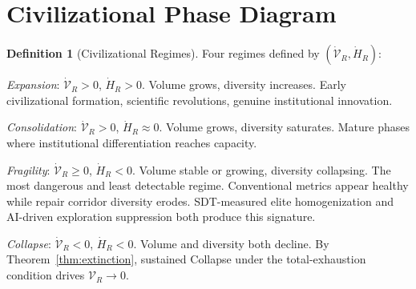 \documentclass[12pt, a4paper]{article}
\theoremstyle{plain}
\theoremstyle{definition}
\newtheorem{definition}{Definition}
\theoremstyle{remark}
\begin{document}
\section{Civilizational Phase Diagram}

\begin{definition}[Civilizational Regimes]
Four regimes defined by $(\dot{\mathcal{V}}_R, \dot{H}_R)$:

\textit{Expansion}: $\dot{\mathcal{V}}_R > 0$, $\dot{H}_R > 0$. Volume grows, diversity increases. Early civilizational formation, scientific revolutions, genuine institutional innovation.

\textit{Consolidation}: $\dot{\mathcal{V}}_R > 0$, $\dot{H}_R \approx 0$. Volume grows, diversity saturates. Mature phases where institutional differentiation reaches capacity.

\textit{Fragility}: $\dot{\mathcal{V}}_R \geq 0$, $\dot{H}_R < 0$. Volume stable or growing, diversity collapsing. The most dangerous and least detectable regime. Conventional metrics appear healthy while repair corridor diversity erodes. SDT-measured elite homogenization and AI-driven exploration suppression both produce this signature.

\textit{Collapse}: $\dot{\mathcal{V}}_R < 0$, $\dot{H}_R < 0$. Volume and diversity both decline. By Theorem~\ref{thm:extinction}, sustained Collapse under the total-exhaustion condition drives $\mathcal{V}_R \to 0$.
\end{definition}
\end{document}
